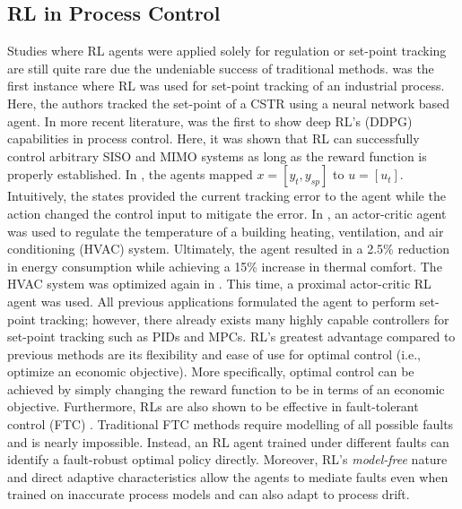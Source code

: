 \subsection{RL in Process Control}
Studies where RL agents were applied solely for regulation or set-point tracking are still quite rare due the undeniable success of traditional methods. \cite{pc} was the first instance where RL was used for set-point tracking of an industrial process. Here, the authors tracked the set-point of a CSTR using a neural network based agent. In more recent literature, \cite{pc1} was the first to show deep RL's (DDPG) capabilities in process control.  Here, it was shown that RL can successfully control arbitrary SISO and MIMO systems as long as the reward function is properly established.  In \cite{pc1}, the agents mapped $x = [y_t, y_{sp}]$ to $u = [u_t]$. Intuitively, the states provided the current tracking error to the agent while the action changed the control input to mitigate the error. In \cite{pc2}, an actor-critic agent was used to regulate the temperature of a building heating, ventilation, and air conditioning (HVAC) system. Ultimately, the agent resulted in a 2.5\% reduction in energy consumption while achieving a 15\% increase in thermal comfort. The HVAC system was optimized again in \cite{pc3}.  This time, a proximal actor-critic RL agent was used. All previous applications formulated the agent to perform set-point tracking; however, there already exists many highly capable controllers for set-point tracking such as PIDs and MPCs. RL's greatest advantage compared to previous methods are its flexibility and ease of use for optimal control (i.e., optimize an economic objective). More specifically, optimal control can be achieved by simply changing the reward function to be in terms of an economic objective. Furthermore, RLs are also shown to be effective in fault-tolerant control (FTC) \cite{ftc}. Traditional FTC methods require modelling of all possible faults and is nearly impossible. Instead, an RL agent trained under different faults can identify a fault-robust optimal policy directly. Moreover, RL's \textit{model-free} nature and direct adaptive characteristics allow the agents to mediate faults even when trained on inaccurate process models and can also adapt to process drift.













